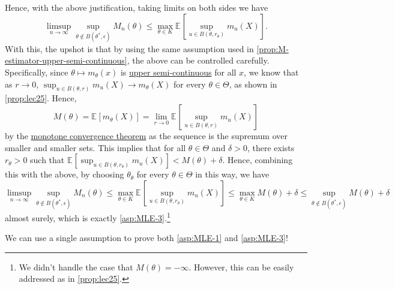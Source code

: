 Hence, with the above justification, taking limits on both sides we have
\[
	\limsup_{n \to \infty} \sup _{\theta \notin B(\theta ^{\ast} , \epsilon )} M_n(\theta )
	\leq \max _{\theta \in K} \mathbb{E}_{}\left[\sup _{u \in B(\theta , r_\theta )} m_u(X)\right] .
\]
With this, the upshot is that by using the same assumption used in \autoref{prop:M-estimator-upper-semi-continuous}, the above can be controlled carefully. Specifically, since \(\theta \mapsto m_\theta (x)\) is \hyperref[def:upper-semi-continuous]{upper semi-continuous} for all \(x\), we know that as \(r \to 0\), \(\sup _{u\in B(\theta , r)} m_u(X) \to m_\theta (X)\) for every \(\theta \in \Theta \), as shown in \autoref{prop:lec25}. Hence,
\[
	M(\theta )
	= \mathbb{E}_{}[m_\theta (X)]
	= \lim_{r \to 0} \mathbb{E}_{}\left[\sup _{u \in B(\theta , r)} m_u(X) \right]
\]
by the \href{https://en.wikipedia.org/wiki/Monotone_convergence_theorem}{monotone convergence theorem} as the sequence is the supremum over smaller and smaller sets. This implies that for all \(\theta \in \Theta \) and \(\delta > 0\), there exists \(r_\theta > 0\) such that \(\mathbb{E}_{}[\sup _{u \in B(\theta , r_\theta )} m_u(X)] < M(\theta ) + \delta \). Hence, combining this with the above, by choosing \(\theta _{\theta }\) for every \(\theta \in \Theta \) in this way, we have
\[
	\limsup_{n \to \infty} \sup _{\theta \notin B(\theta ^{\ast} , \epsilon )} M_n(\theta )
	\leq \max _{\theta \in K} \mathbb{E}_{}\left[\sup _{u \in B(\theta , r_\theta )} m_u(X)\right]
	\leq \max _{\theta \in K} M(\theta ) + \delta
	\leq \sup _{\theta \notin B(\theta ^{\ast} , \epsilon )}M(\theta ) + \delta
\]
almost surely, which is exactly \autoref{asp:MLE-3}.\footnote{We didn't handle the case that \(M(\theta ) = -\infty \). However, this can be easily addressed as in \autoref{prop:lec25}.}

\begin{intuition}
	We can use a single assumption to prove both \autoref{asp:MLE-1} and \autoref{asp:MLE-3}!
\end{intuition}